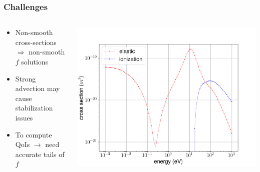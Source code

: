 \documentclass[mathserif, aspectratio=169]{beamer}
\begin{document}
\begin{frame}
	\frametitle{Challenges}
	\begin{columns}
		\begin{column}{0.4\textwidth}
			\begin{itemize}
				\item Non-smooth cross-sections $\Rightarrow$ non-smooth $f$ solutions
				\item Strong advection may cause stabilization issues
				\item To compute QoIs $\rightarrow$ need accurate tails of $f$ 
			\end{itemize}
		\end{column}
		\begin{column}{0.6\textwidth}
			\vspace*{-0.8in}
			\begin{center}
				\includegraphics[width=\columnwidth]{g0_g2_cs.png}
			\end{center}
		\end{column}
	\end{columns}
\end{frame}

\end{document}
